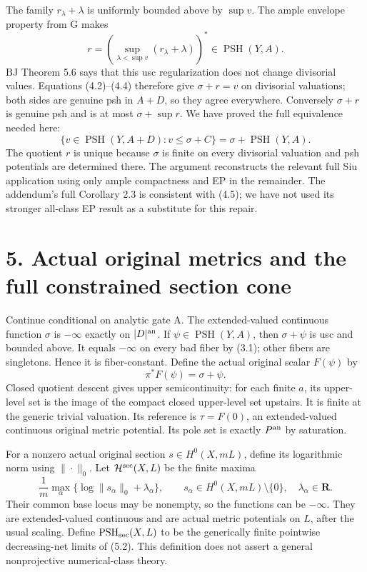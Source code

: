 \documentclass[
  10pt,
]{article}
\begin{document}
The family \(r_\lambda+\lambda\) is uniformly bounded above by
\(\sup v\). The ample envelope property from G makes \[
 r=\left(\sup_{\lambda<\sup v}(r_\lambda+\lambda)\right)^*
 \in\operatorname{PSH}(Y,A).
\] BJ Theorem 5.6 says that this usc regularization does not change
divisorial values. Equations (4.2)--(4.4) therefore give \(\sigma+r=v\)
on divisorial valuations; both sides are genuine psh in \(A+D\), so they
agree everywhere. Conversely \(\sigma+r\) is genuine psh and is at most
\(\sigma+\sup r\). We have proved the full equivalence needed here: \[
 \{v\in\operatorname{PSH}(Y,A+D):v\leq\sigma+C\}
       =\sigma+\operatorname{PSH}(Y,A).
 \tag{4.5}
\] The quotient \(r\) is unique because \(\sigma\) is finite on every
divisorial valuation and psh potentials are determined there. The
argument reconstructs the relevant full Siu application using only ample
compactness and EP in the remainder. The addendum's full Corollary 2.3
is consistent with (4.5); we have not used its stronger all-class EP
result as a substitute for this repair.

\section{5. Actual original metrics and the full constrained section
cone}\label{actual-original-metrics-and-the-full-constrained-section-cone}

Continue conditional on analytic gate A. The extended-valued continuous
function \(\sigma\) is \(-\infty\) exactly on \(|D|^{\rm an}\). If
\(\psi\in\operatorname{PSH}(Y,A)\), then \(\sigma+\psi\) is usc and
bounded above. It equals \(-\infty\) on every bad fiber by (3.1); other
fibers are singletons. Hence it is fiber-constant. Define the actual
original scalar \(F(\psi)\) by \[
 \pi^*F(\psi)=\sigma+\psi.
 \tag{5.1}
\] Closed quotient descent gives upper semicontinuity: for each finite
\(a\), its upper-level set is the image of the compact closed
upper-level set upstairs. It is finite at the generic trivial valuation.
Its reference is \(\tau=F(0)\), an extended-valued continuous original
metric potential. Its pole set is exactly \(P^{\rm an}\) by saturation.

For a nonzero actual original section \(s\in H^0(X,mL)\), define its
logarithmic norm using \(\|\cdot\|_0\). Let
\(\mathcal H^{\rm sec}(X,L)\) be the finite maxima \[
 \frac1m\max_\alpha\{\log\|s_\alpha\|_0+\lambda_\alpha\},
 \qquad s_\alpha\in H^0(X,mL)\setminus\{0\},\quad\lambda_\alpha\in\mathbf R.
 \tag{5.2}
\] Their common base locus may be nonempty, so the functions can be
\(-\infty\). They are extended-valued continuous and are actual metric
potentials on \(L\), after the usual scaling. Define
\(\operatorname{PSH}_{\rm sec}(X,L)\) to be the generically finite
pointwise decreasing-net limits of (5.2). This definition does not
assert a general nonprojective numerical-class theory.
\end{document}
